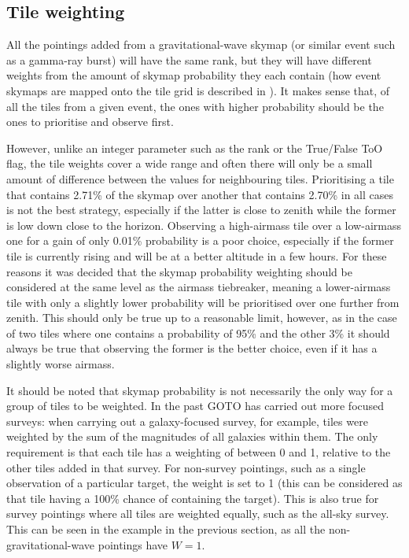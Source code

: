 \subsection{Tile weighting}
\label{sec:weights}
\begin{colsection}

All the pointings added from a gravitational-wave skymap (or similar event such as a gamma-ray burst) will have the same rank, but they will have different weights from the amount of skymap probability they each contain (how event skymaps are mapped onto the tile grid is described in ). It makes sense that, of all the tiles from a given event, the ones with higher probability should be the ones to prioritise and observe first.

However, unlike an integer parameter such as the rank or the True/False ToO flag, the tile weights cover a wide range and often there will only be a small amount of difference between the values for neighbouring tiles. Prioritising a tile that contains 2.71\% of the skymap over another that contains 2.70\% in all cases is not the best strategy, especially if the latter is close to zenith while the former is low down close to the horizon. Observing a high-airmass tile over a low-airmass one for a gain of only 0.01\% probability is a poor choice, especially if the former tile is currently rising and will be at a better altitude in a few hours. For these reasons it was decided that the skymap probability weighting should be considered at the same level as the airmass tiebreaker, meaning a lower-airmass tile with only a slightly lower probability will be prioritised over one further from zenith. This should only be true up to a reasonable limit, however, as in the case of two tiles where one contains a probability of 95\% and the other 3\% it should always be true that observing the former is the better choice, even if it has a slightly worse airmass.

It should be noted that skymap probability is not necessarily the only way for a group of tiles to be weighted. In the past GOTO has carried out more focused surveys: when carrying out a galaxy-focused survey, for example, tiles were weighted by the sum of the magnitudes of all galaxies within them. The only requirement is that each tile has a weighting of between 0 and 1, relative to the other tiles added in that survey. For non-survey pointings, such as a single observation of a particular target, the weight is set to 1 (this can be considered as that tile having a 100\% chance of containing the target). This is also true for survey pointings where all tiles are weighted equally, such as the all-sky survey. This can be seen in the example  in the previous section, as all the non-gravitational-wave pointings have $W=1$.

\newpage

\end{colsection}


